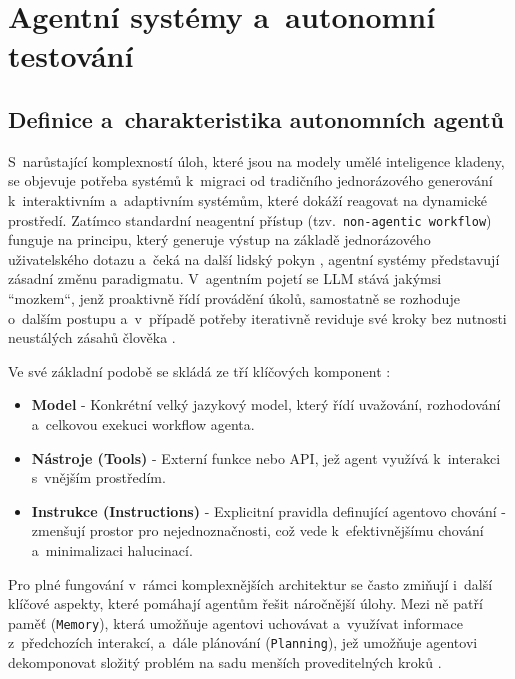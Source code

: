 \documentclass[czech, ing, kiv, he, iso690numb, viewonly]{fasthesis}
\begin{document}
\section{Agentní systémy a~autonomní testování}

\subsection{Definice a~charakteristika autonomních agentů}
S~narůstající komplexností úloh, které jsou na modely umělé inteligence kladeny, se objevuje potřeba systémů k~migraci 
od tradičního jednorázového generování k~interaktivním a~adaptivním systémům, které dokáží reagovat na dynamické prostředí.
Zatímco standardní neagentní přístup (tzv.~\texttt{non-agentic workflow}) funguje na principu, 
který generuje výstup na základě jednorázového uživatelského dotazu a~čeká na další lidský pokyn \cite{singh2024enhancing}, agentní systémy představují zásadní změnu paradigmatu.
V~agentním pojetí se LLM stává jakýmsi ``mozkem``, jenž proaktivně řídí provádění úkolů, samostatně se rozhoduje o~dalším postupu a~v~případě potřeby 
iterativně reviduje své kroky bez nutnosti neustálých zásahů člověka \cite{singh2024enhancing,ahmadi2025mcp,openai2025_agents_guide}.

Ve své základní podobě se skládá ze tří klíčových komponent \cite{openai2025_agents_guide}:



\begin{itemize}
    \item \textbf{Model} - Konkrétní velký jazykový model, který řídí uvažování, rozhodování a~celkovou exekuci workflow agenta.
    \item \textbf{Nástroje (Tools)} - Externí funkce nebo API, jež agent využívá k~interakci s~vnějším prostředím.
    \item \textbf{Instrukce (Instructions)} - Explicitní pravidla definující agentovo chování - zmenšují prostor pro nejednoznačnosti, což vede k~efektivnějšímu chování a~minimalizaci halucinací.
\end{itemize}


Pro plné fungování v~rámci komplexnějších architektur se často zmiňují i~další klíčové aspekty, které pomáhají agentům řešit náročnější úlohy. Mezi ně patří 
paměť (\texttt{Memory}), která umožňuje agentovi uchovávat a~využívat informace z~předchozích interakcí, a~dále plánování (\texttt{Planning}), jež umožňuje 
agentovi dekomponovat složitý problém na sadu menších proveditelných kroků \cite{sarkar2025survey}.
\end{document}
